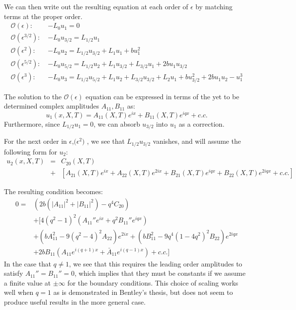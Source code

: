 \documentclass[api,pof,pre,12pt,a4paper]{revtex4-1}
\newcommand{\beqn}{\begin{equation}}
\newcommand{\eeqn}{\end{equation}}
\newcommand{\beqa}{\begin{eqnarray}}
\newcommand{\eeqa}{\end{eqnarray}}
\begin{document}
We can then write out the resulting equation at each order of $\epsilon$ by matching terms at the proper order.
\begin{subequations}
\begin{align}
\mathcal{O}(\epsilon): \:  &-L_0 u_1 =0
\label{eq:msh23o1b} \\
\mathcal{O}(\epsilon^{3/2}): \: &-L_0 u_{3/2} = L_{1/2} u_1 
\label{eq:msh23o15b} \\
\mathcal{O}(\epsilon^2): \:  &-L_0 u_2 = L_{1/2} u_{3/2} +L_1 u_1 +b u_1^2
\label{eq:msh23o2b}\\
\mathcal{O}(\epsilon^{5/2}): \:  &-L_0 u_{5/2} = L_{1/2} u_{2} +L_1 u_{3/2}+ L_{3/2} u_1 +2b u_1 u_{3/2}
\label{eq:msh23o25b}\\
\mathcal{O}(\epsilon^{3}): \:  &-L_0 u_{3} = L_{1/2} u_{5/2} +L_1 u_{2}+ L_{3/2} u_{3/2}+L_2 u_1   +b u_{3/2}^2+2b u_1 u_2 -u_1^3
\label{eq:msh23o25b}
\end{align}
\end{subequations}

The solution to the $\mathcal{O}(\epsilon)$ equation can be expressed in terms of the yet to be determined complex amplitudes $A_{11}, B_{11}$ as:
\beqn
u_1(x,X,T)=A_{11}(X,T)e^{i x} +B_{11}(X,T)e^{i q x} +c.c.
\label{eq:sol23o1}
\eeqn
Furthermore, since $L_{1/2} u_1=0$, we can absorb $u_{3/2}$ into $u_1$ as a correction. 

For the next order in $\epsilon$,$\mathcal(\epsilon^2)$ , we see that $L_{1/2} u_{3/2}$ vanishes, and will assume the following form for $u_2$:
\beqa
u_2(x,X,T)&=&C_{20}(X,T)  \\
&+ &\left[ A_{21}(X,T)e^{i x}+A_{22}(X,T)e^{2 i x} +B_{21}(X,T)e^{i q x} + B_{22}(X,T)e^{2 i q x} +c.c.\right]\nonumber
\label{eq:sol23o2}
\eeqa

The resulting condition becomes:
\begin{align}
	0=& \left(2 b (|A_{11}|^2+|B_{11}|^2)-q^4 C_{20} \right) \nonumber \\
&+\biggl[ 4(q^2-1)^2\left( A_{11}''e^{ix}+q^2 B_{11}''e^{iqx} \right)\nonumber \\
 &+\left(b A_{11}^2-9(q^2-4)^2A_{22}\right)e^{2 i x} +\left(b B_{11}^2-9q^4 (1-4q^2)^2 B_{22}\right)e^{2 i q x} \nonumber \\
&+2b B_{11}\left(A_{11}e^{i(q+1)x}+\bar{A}_{11}e^{i(q-1)x} \right)+ c.c.\biggr]
\label{eq:solvability2}
\end{align}
In the case that $q\neq 1$, we see that this requires the leading order amplitudes to satisfy $A_{11}''=B_{11}''=0$, which implies that they must be constants if we assume a finite value at $\pm \infty$ for the boundary conditions.  This choice of scaling works well when $q=1$ as is demonstrated in Bentley's thesis, but does not seem to produce useful results in the more general case. 
\end{document}
